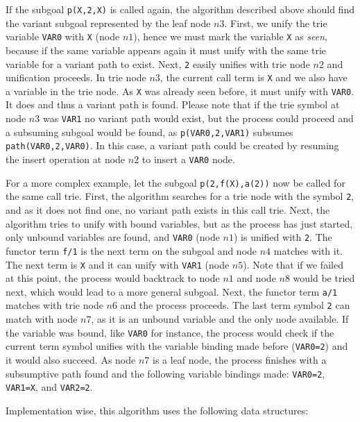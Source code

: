 If the subgoal \texttt{p(X,2,X)} is called again, the algorithm described above
should find the variant subgoal represented by the leaf node $n3$. First, we unify the trie variable
\texttt{VAR0} with \texttt{X} (node $n1$), hence we must mark the variable \texttt{X} as \textit{seen},
because if the same variable appears again it must unify with the same trie variable for a variant path
to exist. Next, \texttt{2} easily unifies with trie node $n2$ and unification proceeds. In trie node $n3$,
the current call term is \texttt{X} and we also have a variable in the trie node. As \texttt{X} was already seen before,
it must unify with \texttt{VAR0}. It does and thus a variant path is found. Please note that if
the trie symbol at node $n3$ was \texttt{VAR1} no variant path would exist, but the process could proceed
and a subsuming subgoal would be found, as \texttt{p(VAR0,2,VAR1)} subsumes \texttt{path(VAR0,2,VAR0)}.
In this case, a variant path could be created by resuming the insert operation at node $n2$ to insert
a \texttt{VAR0} node.

For a more complex example, let the subgoal \texttt{p(2,f(X),a(2))} now be called for the same call trie. First,
the algorithm searches for a trie node with the symbol \texttt{2}, and as it does not find one, no variant path
exists in this call trie. Next, the algorithm tries to unify with bound variables, but as the process
has just started, only unbound variables are found, and \texttt{VAR0} (node $n1$) is unified with \texttt{2}.
The functor term \texttt{f/1} is the next term on the subgoal and node $n4$ matches with it.
The next term is \texttt{X} and it can unify with \texttt{VAR1} (node $n5$).
Note that if we failed at this point, the process would backtrack to node $n1$ and node $n8$
would be tried next, which would lead to a more general subgoal.
Next, the functor term \texttt{a/1} matches with trie node $n6$ and the process proceeds.
The last term symbol \texttt{2} can match with node $n7$, as it is an unbound variable
and the only node available.
If the variable was bound, like \texttt{VAR0} for instance,
the process would check if the current term symbol unifies with the variable binding made before (\texttt{VAR0=2}) and
it would also succeed. As node $n7$ is a leaf node, the process finishes with a subsumptive path found and
the following variable bindings made: \texttt{VAR0=2}, \texttt{VAR1=X}, and \texttt{VAR2=2}.

Implementation wise, this algorithm uses the following data structures:

